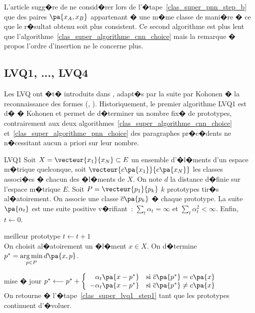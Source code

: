 L'article  sugg�re de ne consid�rer lors de l'�tape~\ref{clas_super_pnn_step_b} que des paires $\pa{x_A,x_B}$ appartenant � une m�me classe de mani�re � ce que le r�sultat obtenu soit plus consistent. Ce second algorithme est plus lent que l'algorithme~\ref{clas_super_algorithme_cnn_choice} mais la remarque � propos l'ordre d'insertion ne le concerne plus.





\subsection{LVQ1, ..., LVQ4}

Les LVQ ont �t� introduits dans , adapt�s par la suite par Kohonen � la reconnaissance des formes (, ). Historiquement, le premier algorithme LVQ1 est d� � Kohonen et permet de d�terminer un nombre fix� de prototypes, contrairement aux deux algorithmes~\ref{clas_super_algorithme_cnn_choice} et~\ref{clas_super_algorithme_pnn_choice} des paragraphes pr�c�dents ne n�cessitant aucun a priori sur leur nombre.



        \begin{xalgorithm}{LVQ1}\label{clas_super_lvq1_algo}
        Soit $X = \vecteur{x_1}{x_N} \subset E$ un ensemble d'�l�ments d'un espace m�trique quelconque, 
        soit $\vecteur{c\pa{x_1}}{c\pa{x_N}}$ les classes associ�es � chacun des �l�ments de $X$. On note 
        $d$ la distance d�finie sur l'espace m�trique $E$.
        Soit $P = \vecteur{p_1}{p_k}$ $k$ prototypes tir�s al�atoirement.    
        On associe une classe $\overline{c}\pa{p_k}$ � chaque 
        prototype. La suite $\pa{\alpha_t}$ est une suite positive v�rifiant~: 
        $\sum_t \alpha_t = \infty$ et $\sum_t \alpha_t^2 < \infty$. Enfin, $t \longleftarrow 0$.

        \begin{xalgostep}{meilleur prototype}\label{clas_super_lvq1_step1}
        $t \longleftarrow t +1$ \\
        On choisit al�atoirement un �l�ment $x \in X$.
        On d�termine $p^* = \underset{p \in P}{\arg \min} \, d\pa{x,p}$.
        \end{xalgostep}

        \begin{xalgostep}{mise � jour}
        $p^*  \longleftarrow p^*  + \left\{ \begin{array}{rl}
                                    \alpha_t \pa{ x - p^*}         & \text{si } \overline{c}\pa{p^*} = c\pa{x}\\
                                    - \alpha_t \pa{ x - p^*}     & \text{si } \overline{c}\pa{p^*} \neq c\pa{x}
                                    \end{array} \right.$ \\
        On retourne � l'�tape~\ref{clas_super_lvq1_step1} tant que les prototypes continuent d'�voluer.
        \end{xalgostep}
        \end{xalgorithm}
        
